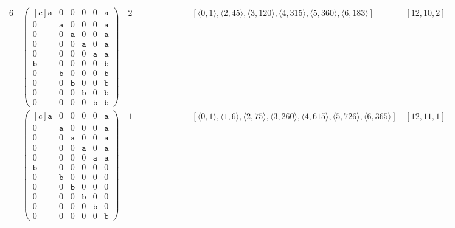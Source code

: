 \documentclass[12pt]{article}
\theoremstyle{definition}
\theoremstyle{plain}
\begin{document}
{\begin{longtable}{@{}cYcccccccZc@{}}
$6$
& $\begin{pmatrix*}[c]
\mathtt{a}  &  0  &  0  &  0  &  0  &  \mathtt{a}  \\
0  &  \mathtt{a}  &  0  &  0  &  0  &  \mathtt{a}  \\
0  &  0  &  \mathtt{a}  &  0  &  0  &  \mathtt{a}  \\
0  &  0  &  0  &  \mathtt{a} &  0  &  \mathtt{a}  \\
0  &  0  &  0  &  0  &  \mathtt{a}  &  \mathtt{a}  \\
\mathtt{b}  &  0  &  0  &  0  &  0  &  \mathtt{b}  \\
0  &  \mathtt{b}  &  0  &  0  &  0  &  \mathtt{b}  \\
0  &  0  &  \mathtt{b}  &  0  &  0  & \mathtt{b}   \\
0  &  0  &  0  &  \mathtt{b}  &  0   &  \mathtt{b}  \\
0  &  0  &  0  &  0  &  \mathtt{b}   &  \mathtt{b}
\end{pmatrix*}$
& $2$
&
&
&
&
&
&
& $[\langle0,1\rangle,\allowbreak\langle2,45\rangle,\allowbreak\langle3,120\rangle,\allowbreak\langle4,315\rangle,\allowbreak\langle5,360\rangle,\allowbreak\langle6,183\rangle]$
& $[12,10,2]$   \\

\cmidrule(lr){2-11}

& $\begin{pmatrix*}[c]
\mathtt{a}  &  0  &  0  &  0  &  0  &  \mathtt{a}  \\
0  &  \mathtt{a}  &  0  &  0  &  0  &  \mathtt{a}  \\
0  &  0  &  \mathtt{a}  &  0  &  0  &  \mathtt{a}  \\
0  &  0  &  0  &  \mathtt{a} &  0  &  \mathtt{a}  \\
0  &  0  &  0  &  0  &  \mathtt{a}  &  \mathtt{a}  \\
\mathtt{b}  &  0  &  0  &  0  &  0  &  0  \\
0  &  \mathtt{b}  &  0  &  0  &  0  & 0  \\
0  &  0  &  \mathtt{b}  &  0  &  0  & 0   \\
0  &  0  &  0  &  \mathtt{b}  &  0   &  0  \\
0  &  0  &  0  &  0  &  \mathtt{b}   &  0  \\
0  &  0  &  0  &  0  &  0   &  \mathtt{b}
\end{pmatrix*}$
& $1$
&
&
&
&
&
&
& $[\langle0,1\rangle,\allowbreak\langle1,6\rangle,\allowbreak\langle2,75\rangle,\allowbreak\langle3,260\rangle,\allowbreak\langle4,615\rangle,\allowbreak\langle5,726\rangle,\allowbreak\langle6,365\rangle]$
& $[12,11,1]$     \\


\end{longtable}}
\end{document}
